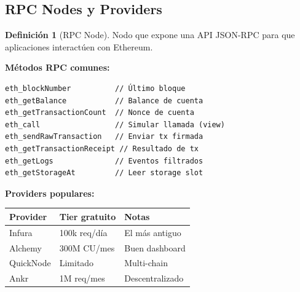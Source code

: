 \documentclass[11pt,a4paper,twoside,openright]{book}
\theoremstyle{definition}
\newtheorem{definition}{Definición}[chapter]
\theoremstyle{plain}
\theoremstyle{remark}
\begin{document}
\begin{center}
\end{center}

\subsection{RPC Nodes y Providers}

\begin{definition}[RPC Node]
Nodo que expone una API JSON-RPC para que aplicaciones interactúen con Ethereum.
\end{definition}

\textbf{Métodos RPC comunes:}
\begin{verbatim}
eth_blockNumber          // Último bloque
eth_getBalance           // Balance de cuenta
eth_getTransactionCount  // Nonce de cuenta
eth_call                 // Simular llamada (view)
eth_sendRawTransaction   // Enviar tx firmada
eth_getTransactionReceipt // Resultado de tx
eth_getLogs              // Eventos filtrados
eth_getStorageAt         // Leer storage slot
\end{verbatim}

\textbf{Providers populares:}
\begin{center}
\begin{tabular}{lll}
\toprule
\textbf{Provider} & \textbf{Tier gratuito} & \textbf{Notas} \\
\midrule
Infura & 100k req/día & El más antiguo \\
Alchemy & 300M CU/mes & Buen dashboard \\
QuickNode & Limitado & Multi-chain \\
Ankr & 1M req/mes & Descentralizado \\
\bottomrule
\end{tabular}
\end{center}
\end{document}
